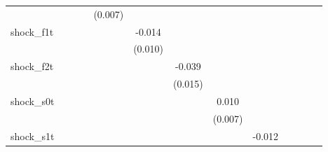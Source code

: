 {\begin{tabular}{l*{12}{c}}
            &                     &                     &                     &     (0.007)         &                     &                     &                     &                     &                     &                     &                     &                     \\
\addlinespace
shock\_f1t   &                     &                     &                     &                     &      -0.014         &                     &                     &                     &                     &                     &                     &                     \\
            &                     &                     &                     &                     &     (0.010)         &                     &                     &                     &                     &                     &                     &                     \\
\addlinespace
shock\_f2t   &                     &                     &                     &                     &                     &      -0.039\sym{**} &                     &                     &                     &                     &                     &                     \\
            &                     &                     &                     &                     &                     &     (0.015)         &                     &                     &                     &                     &                     &                     \\
\addlinespace
shock\_s0t   &                     &                     &                     &                     &                     &                     &       0.010         &                     &                     &                     &                     &                     \\
            &                     &                     &                     &                     &                     &                     &     (0.007)         &                     &                     &                     &                     &                     \\
\addlinespace
shock\_s1t   &                     &                     &                     &                     &                     &                     &                     &      -0.012         &                     &                     &                     &                     \\

\end{tabular}}
